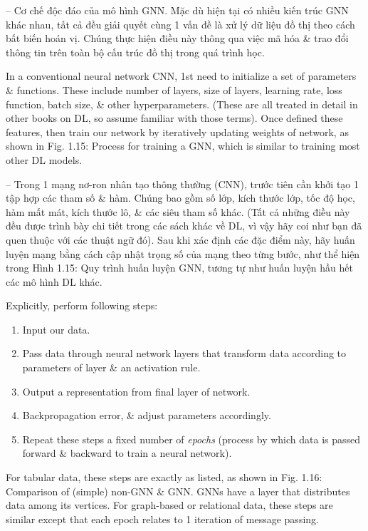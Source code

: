 \documentclass{article}
\begin{document}
\begin{itemize}
\begin{itemize}
\begin{itemize}
            -- {\sf Cơ chế độc đáo của mô hình GNN.} Mặc dù hiện tại có nhiều kiến trúc GNN khác nhau, tất cả đều giải quyết cùng 1 vấn đề là xử lý dữ liệu đồ thị theo cách bất biến hoán vị. Chúng thực hiện điều này thông qua việc mã hóa \& trao đổi thông tin trên toàn bộ cấu trúc đồ thị trong quá trình học.

            In a conventional neural network CNN, 1st need to initialize a set of parameters \& functions. These include number of layers, size of layers, learning rate, loss function, batch size, \& other hyperparameters. (These are all treated in detail in other books on DL, so assume familiar with those terms). Once defined these features, then train our network by iteratively updating weights of network, as shown in {\sf Fig. 1.15: Process for training a GNN, which is similar to training most other DL models.}

            -- Trong 1 mạng nơ-ron nhân tạo thông thường (CNN), trước tiên cần khởi tạo 1 tập hợp các tham số \& hàm. Chúng bao gồm số lớp, kích thước lớp, tốc độ học, hàm mất mát, kích thước lô, \& các siêu tham số khác. (Tất cả những điều này đều được trình bày chi tiết trong các sách khác về DL, vì vậy hãy coi như bạn đã quen thuộc với các thuật ngữ đó). Sau khi xác định các đặc điểm này, hãy huấn luyện mạng bằng cách cập nhật trọng số của mạng theo từng bước, như thể hiện trong {\sf Hình 1.15: Quy trình huấn luyện GNN, tương tự như huấn luyện hầu hết các mô hình DL khác.}

            Explicitly, perform following steps:
            \begin{enumerate}
                \item Input our data.
                \item Pass data through neural network layers that transform data according to parameters of layer \& an activation rule.
                \item Output a representation from final layer of network.
                \item Backpropagation error, \& adjust parameters accordingly.
                \item Repeat these steps a fixed number of {\it epochs} (process by which data is passed forward \& backward to train a neural network).
            \end{enumerate}
            For tabular data, these steps are exactly as listed, as shown in {\sf Fig. 1.16: Comparison of (simple) non-GNN \& GNN. GNNs have a layer that distributes data among its vertices.} For graph-based or relational data, these steps are similar except that each epoch relates to 1 iteration of message passing.


\end{itemize}
\end{itemize}
\end{itemize}
\end{document}
